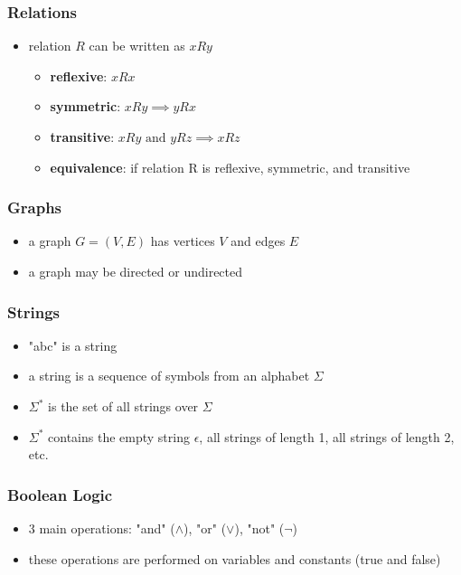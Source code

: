\documentclass[11pt,a4paper]{article}
\begin{document}
\subsubsection{Relations}
\begin{itemize}
    \item relation $R$ can be written as $xRy$
    \begin{itemize}
        \item \textbf{reflexive}: $xRx$
        \item \textbf{symmetric}: $xRy \implies yRx$
        \item \textbf{transitive}: $xRy \text{ and } yRz \implies xRz$
        \item \textbf{equivalence}: if relation R is reflexive, symmetric, and transitive
    \end{itemize}
\end{itemize}

\subsubsection{Graphs}
\begin{itemize}
    \item a graph $G=(V,E)$ has vertices $V$ and edges $E$
    \item a graph may be directed or undirected
\end{itemize}

\subsubsection{Strings}
\begin{itemize}
    \item "abc" is a string
    \item a string is a sequence of symbols from an alphabet $\Sigma$
    \item $\Sigma^*$ is the set of all strings over $\Sigma$
    \item $\Sigma^*$ contains the empty string $\epsilon$, all strings of length 1, all strings of length 2, etc.
\end{itemize}

\subsubsection{Boolean Logic}
\begin{itemize}
    \item 3 main operations: "and" ($\land$), "or" ($\lor$), "not" ($\lnot$)
    \item these operations are performed on variables and constants (true and false)
\end{itemize}
\end{document}
